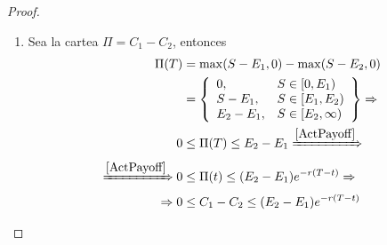\begin{proof}
\begin{enumerate}
        \item Sea la cartea $\Pi = C_1 - C_2$, entonces
        \begin{align*}
            \Pi(T) &= \max(S - E_1,0) - \max(S - E_2,0) \\
            &= \left\{
            \begin{array}{ll}
              0,       & S\in [0,E_1) \\
              S-E_1,        & S\in [E_1,E_2) \\
              E_2-E_1,        & S\in [E_2,\infty)
            \end{array}
            \right\} \Rightarrow \\
            0 &\leq \Pi(T) \leq E_2-E_1 \xRightarrow{\ref{ActPayoff}}\\
            \xRightarrow{\ref{ActPayoff}} 0 &\leq \Pi(t) \leq (E_2-E_1)e^{-r(T-t)} \Rightarrow \\
            \Rightarrow 0 &\leq C_1 - C_2 \leq (E_2-E_1)e^{-r(T-t)}
        \end{align*}
    \end{enumerate}
\end{proof}




